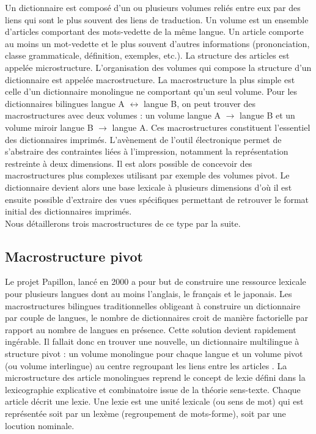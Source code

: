 \documentclass[10pt,a4paper,twoside]{article}
\begin{document}
Un dictionnaire est composé d'un ou plusieurs volumes reliés entre eux par des liens qui sont le plus souvent des liens de traduction. Un volume est un ensemble d'articles comportant des mots-vedette de la même langue. Un article comporte au moins un mot-vedette et le plus souvent d'autres informations (prononciation, classe grammaticale, définition, exemples, etc.). La structure des articles est appelée microstructure. L'organisation des volumes qui compose la structure d'un dictionnaire est appelée macrostructure. La macrostructure la plus simple est celle d'un dictionnaire monolingue ne comportant qu'un seul volume. Pour les dictionnaires bilingues langue A \ensuremath{\leftrightarrow} langue B, on peut trouver des macrostructures avec deux volumes : un volume langue A \ensuremath{\to} langue B et un volume miroir langue B \ensuremath{\to} langue A. Ces macrostructures constituent l'essentiel des dictionnaires imprimés. L'avènement de l'outil électronique permet de s'abstraire des contraintes liées à l'impression, notamment la représentation restreinte à deux dimensions. Il est alors possible de concevoir des macrostructures plus complexes utilisant par exemple des volumes pivot. Le dictionnaire devient alors une base lexicale à plusieurs dimensions d'où il est ensuite possible d'extraire des vues spécifiques permettant de retrouver le format initial des dictionnaires imprimés. \\
Nous détaillerons trois macrostructures de ce type par la suite.

\subsection{Macrostructure pivot}

Le projet Papillon, lancé en 2000 \cite{MTMMEP00} a pour but de construire une ressource lexicale pour plusieurs langues dont au moins l'anglais, le français et le japonais. Les macrostructures bilingues traditionnelles obligeant à construire un dictionnaire par couple de langues, le nombre de dictionnaires croit de manière factorielle par rapport au nombre de langues en présence. Cette solution devient rapidement ingérable. Il fallait donc en trouver une nouvelle, un dictionnaire multilingue à structure pivot : un volume monolingue pour chaque langue et un volume pivot (ou volume interlingue) au centre regroupant les liens entre les articles \cite{GSMM01a}. La microstructure des article monolingues reprend le concept de lexie défini dans la lexicographie explicative et combinatoire \cite{MelcukClasPolguere95} issue de la théorie sens-texte. Chaque article décrit une lexie. Une lexie est une unité lexicale (ou sens de mot) qui est représentée soit par un lexème (regroupement de mots-forme), soit par une locution nominale. \\
\end{document}
